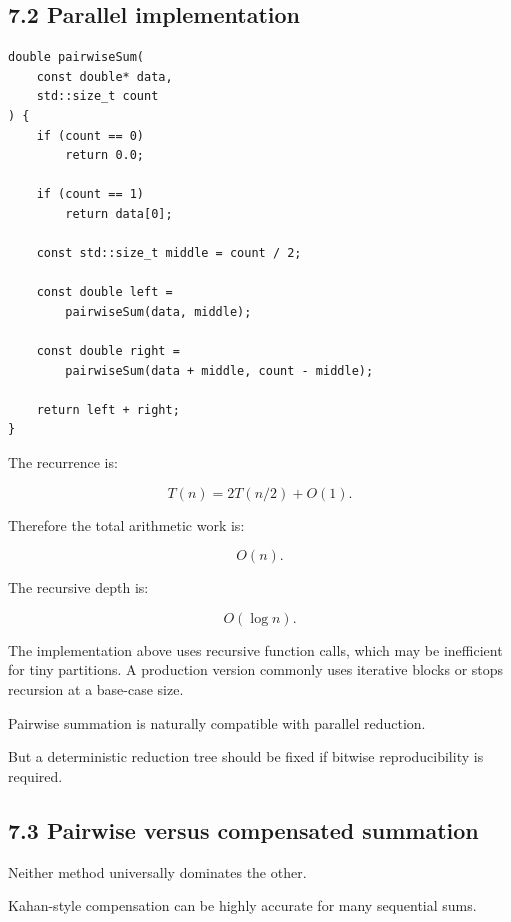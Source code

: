 \subsection{7.2 Parallel implementation}\label{02-foundations-ii-ch028-parallel-implementation}

\hypertarget{02-foundations-ii-ch028-parallel-implementation}{}

\begin{verbatim}
double pairwiseSum(
    const double* data,
    std::size_t count
) {
    if (count == 0)
        return 0.0;

    if (count == 1)
        return data[0];

    const std::size_t middle = count / 2;

    const double left =
        pairwiseSum(data, middle);

    const double right =
        pairwiseSum(data + middle, count - middle);

    return left + right;
}
\end{verbatim}

The recurrence is:

\[ T(n)=2T(n/2)+O(1). \]

Therefore the total arithmetic work is:

\[ \boxed{O(n)}. \]

The recursive depth is:

\[ \boxed{O(\log n)}. \]

The implementation above uses recursive function calls, which may be inefficient for tiny partitions. A production version commonly uses iterative blocks or stops recursion at a base-case size.

Pairwise summation is naturally compatible with parallel reduction.

But a deterministic reduction tree should be fixed if bitwise reproducibility is required.

\subsection{7.3 Pairwise versus compensated summation}\label{02-foundations-ii-ch028-pairwise-versus-compensated-summation}

\hypertarget{02-foundations-ii-ch028-pairwise-versus-compensated-summation}{}

Neither method universally dominates the other.

Kahan-style compensation can be highly accurate for many sequential sums.

